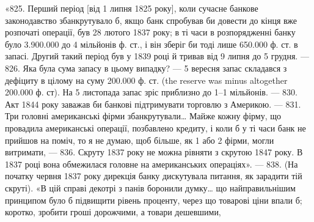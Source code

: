«825. Перший період [від 1 липня 1825 року], коли сучасне банкове
законодавство збанкрутувало б, якщо банк спробував би довести до кінця вже
розпочаті операції, був 28 лютого 1837 року; в ті часи в розпорядженні банку
було \num{3.900.000} до 4 мільйонів ф. ст., і він зберіг би тоді лише \num{650.000} ф. ст.
в запасі. Другий такий період був у 1839 році й тривав від 9 липня до 5 грудня.
— 826. Яка була сума запасу в цьому випадку? — 5 вересня запас
складався з дефіциту в цілому на суму \num{200.000} ф. ст. (the reserve was minus
altogether \num{200.000} ф. ст). На 5 листопада запас зріс приблизно до 1--1
мільйонів. — 830. Акт 1844 року заважав би банкові підтримувати торговлю
з Америкою. — 831. Три головні американські фірми збанкрутували\dots{} Майже
кожну фірму, що провадила американські операції, позбавлено кредиту, і
коли б у ті часи банк не прийшов на поміч, то я не думаю, щоб більше, як
1 або 2 фірми, могли витримати, — 836. Скруту 1837 року не можна рівняти
з скрутою 1847 року. В 1837 році вона обмежилася головне на американських
операціях». — 838. (На початку червня 1837 року дирекція банку дискутувала
питання, як зарадити тій скруті). «В цій справі декотрі з панів боронили думку\dots{}
що найправильнішим принципом було б підвищити рівень проценту, через що
товарові ціни впали б; коротко, зробити гроші дорожчими, а товари дешевшими,
\parbreak{}  %

